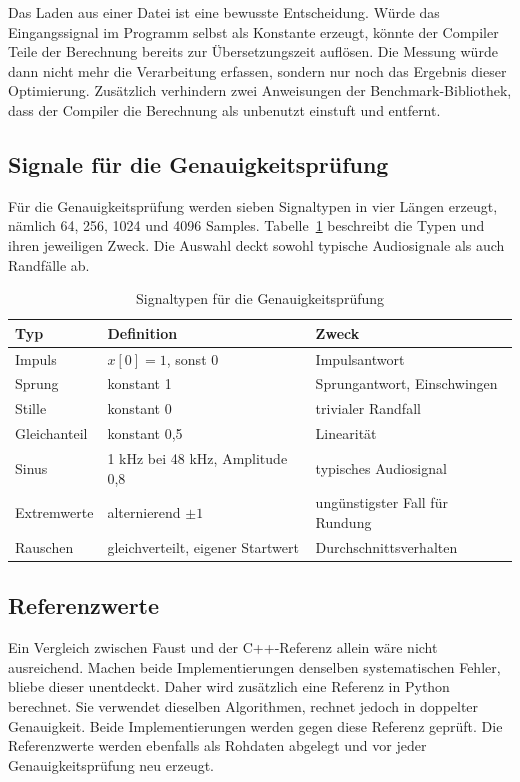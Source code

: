 Das Laden aus einer Datei ist eine bewusste Entscheidung. Würde das
Eingangssignal im Programm selbst als Konstante erzeugt, könnte der Compiler
Teile der Berechnung bereits zur Übersetzungszeit auflösen. Die Messung würde
dann nicht mehr die Verarbeitung erfassen, sondern nur noch das Ergebnis
dieser Optimierung. Zusätzlich verhindern zwei Anweisungen der
Benchmark-Bibliothek, dass der Compiler die Berechnung als unbenutzt
einstuft und entfernt.

\subsection{Signale für die Genauigkeitsprüfung}

Für die Genauigkeitsprüfung werden sieben Signaltypen in vier Längen erzeugt,
nämlich 64, 256, 1024 und 4096 Samples. Tabelle~\ref{tab:signale} beschreibt
die Typen und ihren jeweiligen Zweck. Die Auswahl deckt sowohl typische
Audiosignale als auch Randfälle ab.

\begin{table}[htb]
\centering
\caption{Signaltypen für die Genauigkeitsprüfung}
\label{tab:signale}
\begin{tabular}{lll}
\hline
Typ & Definition & Zweck \\
\hline
Impuls & $x[0]=1$, sonst 0 & Impulsantwort \\
Sprung & konstant 1 & Sprungantwort, Einschwingen \\
Stille & konstant 0 & trivialer Randfall \\
Gleichanteil & konstant 0{,}5 & Linearität \\
Sinus & 1 kHz bei 48 kHz, Amplitude 0{,}8 & typisches Audiosignal \\
Extremwerte & alternierend $\pm 1$ & ungünstigster Fall für Rundung \\
Rauschen & gleichverteilt, eigener Startwert & Durchschnittsverhalten \\
\hline
\end{tabular}
\end{table}

\subsection{Referenzwerte}

Ein Vergleich zwischen Faust und der C++-Referenz allein wäre nicht
ausreichend. Machen beide Implementierungen denselben systematischen Fehler,
bliebe dieser unentdeckt. Daher wird zusätzlich eine Referenz in Python
berechnet. Sie verwendet dieselben Algorithmen, rechnet jedoch in doppelter
Genauigkeit. Beide Implementierungen werden gegen diese Referenz geprüft. Die
Referenzwerte werden ebenfalls als Rohdaten abgelegt und vor jeder
Genauigkeitsprüfung neu erzeugt.



